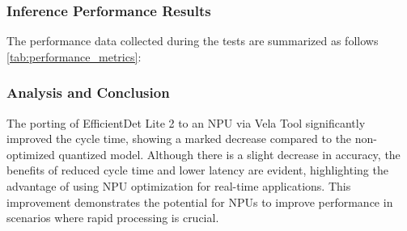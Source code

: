 \subsubsection{Inference Performance Results}
The performance data collected during the tests are summarized as follows \ref{tab:performance_metrics}:

\begin{table}[h]
\centering
\caption{Performance Metrics of Different Models on Various Platforms on average}
\label{tab:performance_metrics}
\end{table}



\subsubsection{Analysis and Conclusion}
The porting of EfficientDet Lite 2 to an NPU via Vela Tool significantly improved the cycle time, showing a marked decrease compared to the non-optimized quantized model. Although there is a slight decrease in accuracy, the benefits of reduced cycle time and lower latency are evident, highlighting the advantage of using NPU optimization for real-time applications. This improvement demonstrates the potential for NPUs to improve performance in scenarios where rapid processing is crucial.

